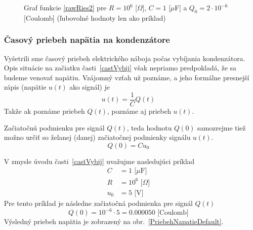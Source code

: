 \documentclass[a4paper, 10pt, ]{article}
\begin{document}
\begin{figure}[!ht]
	\centering


	\caption{Graf funkcie \eqref{rawRies2} pre $R = 10^6$ [$\Omega$], $C = 1$ [$\mu$F] a $Q_0 = 2\cdot 10^{-6}$ [Coulomb] (ľubovolné hodnoty len ako príklad)}
	\label{Graffunkcie}
\end{figure}




\subsubsection{Časový priebeh napätia na kondenzátore}


Vyšetrili sme časový priebeh elektrického náboja počas vybíjania kondenzátora. Opis situácie na začiatku časti~\ref{castVybij} však nepriamo predpokladá, že sa budeme venovať napätiu. Vzájomný vzťah už poznáme, a jeho formálne presnejší zápis (napätie $u(t)$ ako signál) je
\begin{equation} \label{QUsig}
    u(t) = \frac{1}{C} Q(t)
\end{equation}
Takže ak poznáme priebeh $Q(t)$, poznáme aj priebeh $u(t)$.

Začiatočnú podmienku pre signál $Q(t)$, teda hodnotu $Q(0)$ samozrejme tiež možno určiť so želanej (danej) začiatočnej podmienky signálu $u(t)$.
\begin{equation}
    Q(0) = C u_0
\end{equation}



\bigskip

\noindent
V zmysle úvodu časti~\ref{castVybij} uvažujme nasledujúci príklad
\begin{align*}
    C &= 1 \text{ [$\mu$F]} \\
    R &= 10^6  \text{ [$\Omega$]} \\
    u_0 &= 5  \text{ [V]}
\end{align*}
Pre tento príklad je následne začiatočná podmienka pre signál $Q(t)$
\begin{equation}
    Q(0) = 10^{-6} \cdot 5 = 0.000050 \text{ [Coulomb]}
\end{equation}
Výsledný priebeh napätia je zobrazený na obr.~\ref{PriebehNapatieDefault}.
\end{document}

